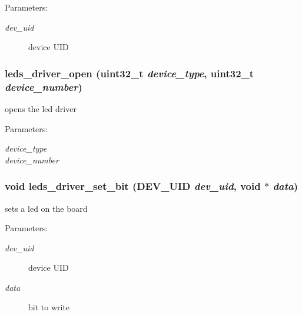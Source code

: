\begin{Desc}
\item[Parameters:]
\begin{description}
\item[{\em dev\_\-uid}]device UID \end{description}
\end{Desc}
\hypertarget{group___l_e_d___d_r_i_v_e_r_gb7d8a66025cb15b1eee23f5612fec260}{
\subsubsection[{leds\_\-driver\_\-open}]{ leds\_\-driver\_\-open (uint32\_\-t {\em device\_\-type}, \/  uint32\_\-t {\em device\_\-number})}}
\label{group___l_e_d___d_r_i_v_e_r_gb7d8a66025cb15b1eee23f5612fec260}


opens the led driver 

\begin{Desc}
\item[Parameters:]
\begin{description}
\item[{\em device\_\-type}]\item[{\em device\_\-number}]\end{description}
\end{Desc}
\hypertarget{group___l_e_d___d_r_i_v_e_r_ge5f9451ef85692996d440cb67950645a}{
\subsubsection[{leds\_\-driver\_\-set\_\-bit}]{\setlength{\rightskip}{0pt plus 5cm}void leds\_\-driver\_\-set\_\-bit ({\bf DEV\_\-UID} {\em dev\_\-uid}, \/  void $\ast$ {\em data})}}
\label{group___l_e_d___d_r_i_v_e_r_ge5f9451ef85692996d440cb67950645a}


sets a led on the board 

\begin{Desc}
\item[Parameters:]
\begin{description}
\item[{\em dev\_\-uid}]device UID \item[{\em data}]bit to write \end{description}
\end{Desc}
